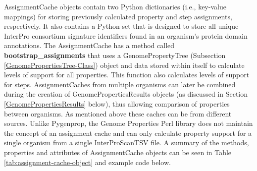 AssignmentCache objects contain two Python dictionaries (i.e., key-value mappings) for storing previously calculated property and step assignments, respectively. It also contains a Python set that is designed to store all unique InterPro consortium signature identifiers found in an organism's protein domain annotations. The AssignmentCache has a method called \textbf{bootstrap\_assignments} that uses a GenomePropertyTree (Subsection \ref{GenomePropertiesTree-Class}) object and data stored within itself to calculate levels of support for all properties. This function also calculates levels of support for steps. AssignmentCaches from multiple organisms can later be combined during the creation of GenomePropertiesResults objects (as discussed in Section \ref{GenomePropertiesResults} below), thus allowing comparison of properties between organisms. As mentioned above these caches can be from different sources. Unlike Pygenprop, the Genome Properties Perl library does not maintain the concept of an assignment cache and can only calculate property support for a single organism from a single InterProScanTSV file. A summary of the methods, properties and attributes of AssignmentCache objects can be seen in Table \ref{tab:assignment-cache-object} and example code below.

